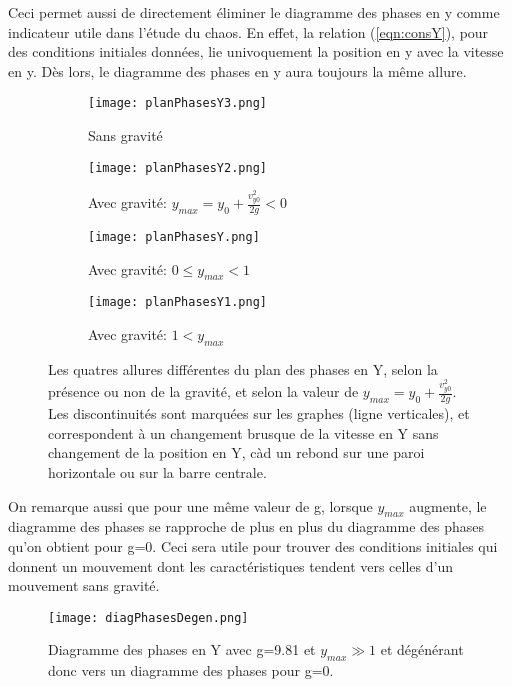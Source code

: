 \documentclass[a4paper]{report}
\begin{document}
Ceci permet aussi de directement éliminer le diagramme des phases en y comme indicateur utile dans l'étude du chaos. En effet, la relation (\ref{eqn:consY}), pour des conditions initiales données, lie univoquement la position en y avec la vitesse en y. Dès lors, le diagramme des phases en y aura toujours la même allure.
\begin{figure}[h!]
        \centering
        \begin{subfigure}[h!]{0.5\textwidth}
                \texttt{[image: planPhasesY3.png]}
                \caption{Sans gravité}
        \end{subfigure}\begin{subfigure}[h!]{0.5\textwidth}
                \texttt{[image: planPhasesY2.png]}
                \caption{Avec gravité: \(y_{max}=y_0 + \frac{v^2_{y0}}{2g} < 0 \) }
        \end{subfigure}

        \begin{subfigure}[h!]{0.5\textwidth}
                \texttt{[image: planPhasesY.png]}
                \caption{Avec gravité: \(0 \leq y_{max} < 1 \)}
        \end{subfigure}\begin{subfigure}[h!]{0.5\textwidth}
                \texttt{[image: planPhasesY1.png]}
                \caption{Avec gravité: \(1<y_{max}\)}
        \end{subfigure}
        \caption[Les quatres allures différentes du plan des phases en Y]{Les quatres allures différentes du plan des phases en Y, selon la présence ou non de la gravité, et selon la valeur de \(y_{max}=y_0 + \frac{v^2_{y0}}{2g}\). Les discontinuités sont marquées sur les graphes (ligne verticales), et correspondent à un changement brusque de la vitesse en Y sans changement de la position en Y, càd un rebond sur une paroi horizontale ou sur la barre centrale.}
\end{figure}

On remarque aussi que pour une même valeur de g, lorsque \(y_{max}\) augmente, le diagramme des phases se rapproche de plus en plus du diagramme des phases qu'on obtient pour g=0. Ceci sera utile pour trouver des conditions initiales qui donnent un mouvement dont les caractéristiques tendent vers celles d'un mouvement sans gravité.
\begin{figure}[h!]
   \texttt{[image: diagPhasesDegen.png]}
      \caption[Diagramme des phases en Y avec g=9,81 dégénérant vers g=0]{Diagramme des phases en Y avec g=9.81 et \(y_{max}\gg 1 \) et dégénérant donc vers un diagramme des phases pour g=0.}
\end{figure}
\end{document}
